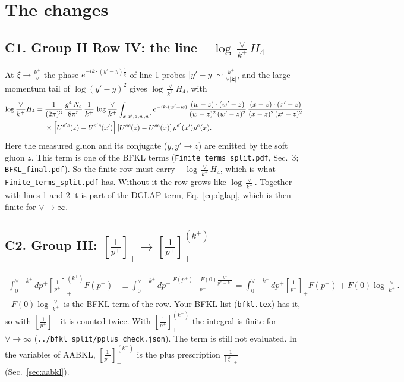 \documentclass[9pt]{article}
\numberwithin{equation}{section}
\begin{document}
\section{The changes}\label{sec:changes}
\subsection*{C1. Group II Row IV: the line $-\log\frac{\vee}{k^+}H_4$}
At $\xi\to\frac{k^+}{\vee}$ the phase $e^{-ik\cdot(y'-y)\frac1\xi}$ of line 1 probes $|y'-y|\sim\frac{k^+}{\vee|\mathbf k|}$, and the large-momentum tail of $\log(y'-y)^2$ gives $\log\frac{\vee}{k^+}H_4$, with
\begin{align}
\log\frac{\vee}{k^+}H_4={}&\frac{1}{(2\pi)^{3}}\,\frac{g^{4}\,N_{c}}{8\pi^{5}}\,\frac{1}{k^{+}}\,\log\frac{\vee}{k^{+}}\int_{x,x',z,w,w'}e^{-ik\cdot (w'-w)}\,\frac{(w-z)\cdot(w'-z)}{(w-z)^{2}\,(w'-z)^{2}}\,\frac{(x-z)\cdot(x'-z)}{(x-z)^{2}\,(x'-z)^{2}}\notag\\
&\times\left[U^{e'c}(z) - U^{e'c}(x')\right]\left[U^{ec}(z) - U^{ce}(x)\right]\rho^{e'}(x') \rho^{e}(x).
\end{align}
Here the measured gluon and its conjugate ($y,y'\to z$) are emitted by the soft gluon $z$. This term is one of the BFKL terms (\texttt{Finite\_terms\_split.pdf}, Sec.~3; \texttt{BFKL\_final.pdf}). So the finite row must carry $-\log\frac{\vee}{k^+}H_4$, which is what \texttt{Finite\_terms\_split.pdf} has. Without it the row grows like $\log\frac{\vee}{k^+}$. Together with lines 1 and 2 it is part of the DGLAP term, Eq.~\eqref{eq:dglap}, which is then finite for $\vee\to\infty$.

\subsection*{C2. Group III: $\left[\frac{1}{p^+}\right]_+\to\left[\frac{1}{p^+}\right]_+^{(k^+)}$}
\begin{align}
\int_0^{\vee-k^+}\!dp^+\left[\frac{1}{p^+}\right]_+^{(k^+)}F(p^+)&\equiv\int_0^{\vee-k^+}\!dp^+\,\frac{F(p^+)-F(0)\frac{k^+}{p^++k^+}}{p^+}=\int_0^{\vee-k^+}\!dp^+\left[\frac{1}{p^+}\right]_+F(p^+)+F(0)\log\frac{\vee}{k^+}.
\end{align}
$-F(0)\log\frac{\vee}{k^+}$ is the BFKL term of the row. Your BFKL list (\texttt{bfkl.tex}) has it, so with $\left[\frac{1}{p^+}\right]_+$ it is counted twice. With $\left[\frac{1}{p^+}\right]_+^{(k^+)}$ the integral is finite for $\vee\to\infty$ (\texttt{../bfkl\_split/pplus\_check.json}). The term is still not evaluated. In the variables of AABKL, $\left[\frac{1}{p^+}\right]_+^{(k^+)}$ is the plus prescription $\frac{1}{[\xi]_+}$ (Sec.~\ref{sec:aabkl}).
\end{document}
